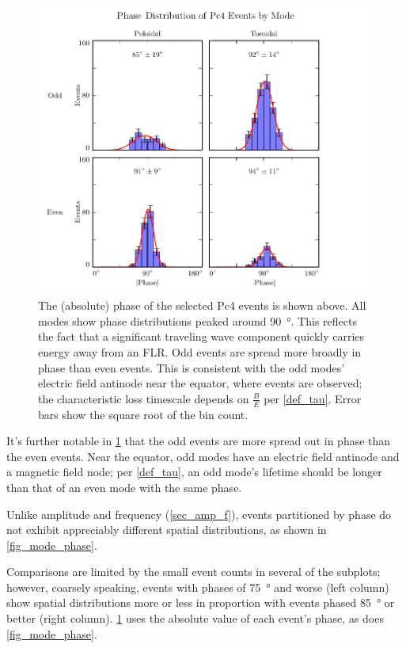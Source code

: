 \begin{figure}[!htb]
  \centering
  \includegraphics[width=\textwidth]{figures/phase.pdf}
  \caption[Phase Distribution of Pc4 Events by Mode]{
    The (absolute) phase of the selected Pc4 events is shown above. All modes
    show phase distributions peaked around \SI{90}{\degree}. This reflects the
    fact that a significant traveling wave component quickly carries energy
    away from an FLR. Odd events are spread more broadly in phase than even
    events. This is consistent with the odd modes' electric field antinode near
    the equator, where events are observed; the characteristic loss timescale
    depends on $\frac{B}{E}$ per \cref{def_tau}. 
    Error bars show the square root of the bin count. 
  }
  \label{fig_phase}
\end{figure}

It's further notable in \cref{fig_phase} that the odd events are more spread
out in phase than the even events. Near the equator, odd modes have an electric
field antinode and a magnetic field node; per \cref{def_tau}, an odd mode's
lifetime should be longer than that of an even mode with the same phase. 

Unlike amplitude and frequency (\cref{sec_amp_f}), events
partitioned by phase do not exhibit appreciably different spatial
distributions, as
shown in \cref{fig_mode_phase}. 




Comparisons are limited by the small event
counts in several of the subplots; however, coarsely speaking, events with
phases of \SI{75}{\degree} and worse (left column) show spatial distributions
more or less in proportion with events phased \SI{85}{\degree} or better (right
column). \cref{fig_phase} uses the absolute value of each event's phase, as
does \cref{fig_mode_phase}. 

